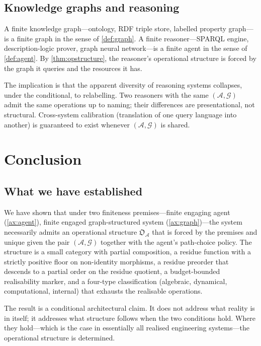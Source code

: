 \documentclass[11pt,a4paper]{article}
\theoremstyle{thmstyle}
\theoremstyle{definition}
\theoremstyle{remark}
\newcommand{\Graph}{\mathcal{G}}
\newcommand{\Agent}{\mathcal{A}}
\newcommand{\OpStr}{\mathfrak{O}}
\begin{document}
\subsection{Knowledge graphs and reasoning}

A finite knowledge graph---ontology, RDF triple store, labelled
property graph---is a finite graph in the sense of \cref{def:graph}.
A finite reasoner---SPARQL engine, description-logic prover, graph
neural network---is a finite agent in the sense of \cref{def:agent}.
By \cref{thm:opstructure}, the reasoner's operational structure is
forced by the graph it queries and the resources it has.

The implication is that the apparent diversity of reasoning systems
collapses, under the conditional, to relabelling. Two reasoners
with the same $(\Agent, \Graph)$ admit the same operations up to
naming; their differences are presentational, not structural.
Cross-system calibration (translation of one query language into
another) is guaranteed to exist whenever $(\Agent, \Graph)$ is
shared.

\section{Conclusion}
\label{sec:conclusion}

\subsection{What we have established}

We have shown that under two finiteness premises---finite engaging
agent (\cref{ax:agent}), finite engaged graph-structured system
(\cref{ax:graph})---the system necessarily admits an operational
structure $\OpStr_\Agent$ that is forced by the premises and unique
given the pair $(\Agent, \Graph)$ together with the agent's
path-choice policy. The structure is a small category with partial
composition, a residue function with a strictly positive floor on
non-identity morphisms, a residue preorder that descends to a
partial order on the residue quotient, a budget-bounded
realisability marker, and a four-type classification (algebraic,
dynamical, computational, internal) that exhausts the realisable
operations.

The result is a conditional architectural claim. It does not
address what reality is in itself; it addresses what structure
follows when the two conditions hold. Where they hold---which is
the case in essentially all realised engineering systems---the
operational structure is determined.
\end{document}
